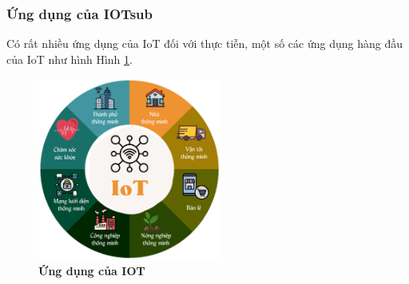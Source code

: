 \documentclass{article} %
\begin{document}
	
	\subsubsection{Ứng dụng của IOTsub}
	
	Có rất nhiều ứng dụng của IoT đối với thực tiễn, một số các ứng dụng hàng đầu của IoT như hình Hình \ref{UngdungIOT}.
	
	\begin{figure}[!ht]
		\centering
		\includegraphics[width=6cm,height=6cm]{Images/UngdungIOT.jpg}
		\caption[Ứng dụng của IOT \cite{uNGDUNGiot}]{\bfseries \fontsize{12pt}{0pt}\selectfont Ứng dụng của IOT\cite{uNGDUNGiot}}
		\label{UngdungIOT}
	\end{figure}
	
\end{document}
